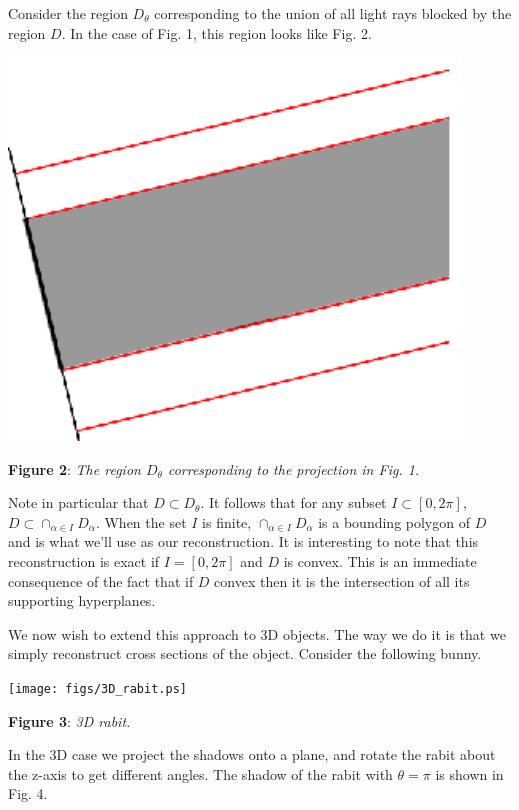 \documentclass[noback]{cuposter}
\begin{document}
Consider the region $D_{\theta}$ corresponding to the union of all light rays blocked by the region $D$.
In the case of Fig. 1, this region looks like Fig. 2.

\vspace*{2cm}
{
\centerline{\includegraphics[width=12cm]
  {figs/shadow_2.ps}}
}
\vspace*{5mm} \textbf{Figure 2}: \textit{The region $D_{\theta}$ corresponding to the projection in Fig. 1.}

Note in particular that $D\subset D_{\theta}$. 
It follows that for any subset $I\subset[0,2\pi]$, $D\subset \cap_{\alpha\in I}D_{\alpha}$.
When the set $I$ is finite, $\cap_{\alpha\in I}D_{\alpha}$ is a bounding polygon of $D$ and is what we'll use as our reconstruction.
It is interesting to note that this reconstruction is exact if $I = [0,2\pi]$ and $D$ is convex.
This is an immediate consequence of the fact that if $D$ convex then it is the intersection of all its supporting hyperplanes.

We now wish to extend this approach to 3D objects.
The way we do it is that we simply reconstruct cross sections of the object.
Consider the following bunny.

\vspace*{2cm}
{
\centerline{\texttt{[image: figs/3D\_rabit.ps]}}
}
\vspace*{5mm} \textbf{Figure 3}: \textit{3D rabit.}

In the 3D case we project the shadows onto a plane, and rotate the rabit about the z-axis to get different angles.
The shadow of the rabit with $\theta=\pi$ is shown in Fig. 4.
\end{document}
